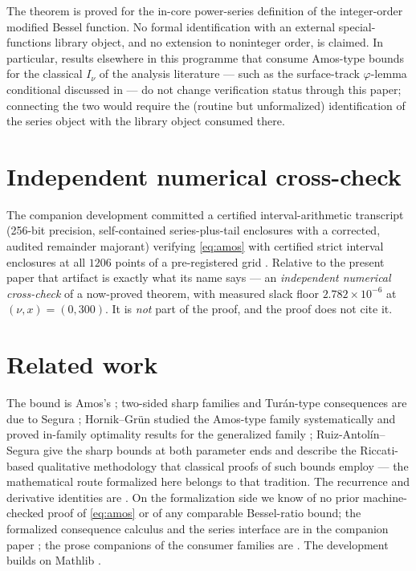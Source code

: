 \documentclass[11pt]{article}
\begin{document}
The theorem is proved for the in-core power-series definition of the
integer-order modified Bessel function.  No formal identification
with an external special-functions library object, and no extension
to noninteger order, is claimed.  In particular, results elsewhere
in this programme that consume Amos-type bounds for the classical
$I_\nu$ of the analysis literature --- such as the surface-track
$\varphi$-lemma conditional discussed in \cite{ErikssonC2} --- do
not change verification status through this paper; connecting the
two would require the (routine but unformalized) identification of
the series object with the library object consumed there.

\section{Independent numerical cross-check}\label{sec:crosscheck}

The companion development committed a certified interval-arithmetic
transcript (256-bit precision, self-contained series-plus-tail
enclosures with a corrected, audited remainder majorant) verifying
\eqref{eq:amos} with certified strict interval enclosures at all
$1206$ points of a pre-registered grid \cite{ErikssonC2}.  Relative to the present
paper that artifact is exactly what its name says --- an
\emph{independent numerical cross-check} of a now-proved theorem,
with measured slack floor $2.782\times10^{-6}$ at $(\nu,x) =
(0,300)$.  It is \emph{not} part of the proof, and the proof does
not cite it.

\section{Related work}\label{sec:related}

The bound is Amos's \cite{Amos74}; two-sided sharp families and
Tur\'an-type consequences are due to Segura \cite{Segura11};
Hornik--Gr\"un studied the Amos-type family systematically
\cite{HG13} and proved in-family optimality results for the
generalized family \cite{HG24}; Ruiz-Antol\'in--Segura \cite{RS16}
give the sharp bounds at both parameter ends and describe the
Riccati-based qualitative methodology that classical proofs of such
bounds employ --- the mathematical route formalized here belongs to
that tradition.  The recurrence and derivative identities are
\cite[10.29]{DLMF}.  On the formalization side we know of no prior
machine-checked proof of \eqref{eq:amos} or of any comparable
Bessel-ratio bound; the formalized consequence calculus and the
series interface are in the companion paper \cite{ErikssonC2}; the
prose companions of the consumer families are
\cite{ErikssonFH26,ErikssonVM26,ErikssonTuran26}.  The development
builds on Mathlib \cite{mathlib20}.
\end{document}
